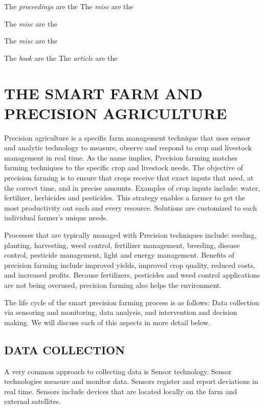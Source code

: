 \documentclass[sigconf]{acmart}
\begin{document}
The \textit{proceedings} are the \cite{vanGundy09}
The \textit{misc} are the \cite{www-google}

The \textit{misc} are the \cite{www-google1}

The \textit{misc} are the \cite{www-google2}

The \textit{book} are the \cite{book}
The \textit{article} are the \cite{article1}

\section{THE SMART FARM AND PRECISION AGRICULTURE}

Precision agriculture is a specific farm management technique that uses sensor and analytic technology to measure, observe and respond to crop and livestock management in real time. As the name implies, Precision farming matches farming techniques to the specific crop and livestock needs. The objective of precision farming is to ensure that crops receive that exact inputs that need, at the correct time, and in precise amounts. Examples of crop inputs include: water, fertilizer, herbicides and pesticides. This strategy enables a farmer to get the most productivity out each and every resource. Solutions are customized to each individual farmer’s unique needs.

Processes that are typically managed with Precision techniques include: seeding, planting, harvesting, weed control, fertilizer management, breeding, disease control, pesticide management, light and energy management. Benefits of precision farming include improved yields, improved crop quality, reduced costs, and increased profits.  Because fertilizers, pesticides and weed control applications are not being overused, precision farming also helps the environment.



The life cycle of the smart precision farming process is as follows: Data collection via sensoring and monitoring, data analysis, and intervention and decision making.  We will discuss each of this aspects in more detail below.

\subsection{DATA COLLECTION}

A very common approach to collecting data is Sensor technology. Sensor technologies measure and monitor data.  Sensors register and report deviations in real time. Sensors include devices that are located locally on the farm and external satellites. 
\end{document}
